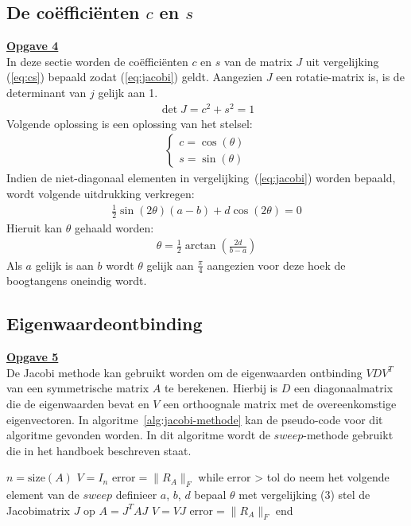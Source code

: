 \documentclass[a4paper, 12pt, titlepage, fleqn]{article}
\begin{document}
\subsection{De co\"effici\"enten $c$ en $s$}
\underline{\textbf{Opgave 4}}\\

In deze sectie worden de co\"effici\"enten $c$ en $s$ van de matrix $J$ uit vergelijking (\ref{eq:cs}) bepaald zodat (\ref{eq:jacobi}) geldt. Aangezien $J$ een rotatie-matrix is, is de determinant van $j$ gelijk aan 1.
\begin{align*}
\det J = c^2 + s^2 = 1
\end{align*}
Volgende oplossing is een oplossing van het stelsel:
\begin{align*}
\begin{cases}
c = \cos(\theta)\\
s = \sin(\theta)
\end{cases}
\end{align*}
Indien de niet-diagonaal elementen in vergelijking~(\ref{eq:jacobi}) worden bepaald, wordt volgende uitdrukking verkregen:
\begin{align*}
\frac{1}{2}\sin(2\theta)(a-b) + d\cos(2\theta) = 0
\end{align*}
Hieruit kan $\theta$ gehaald worden:
\begin{align}\label{eq:theta}
\theta = \frac{1}{2}\arctan\left(\frac{2d}{b-a}\right)
\end{align}
Als $a$ gelijk is aan $b$ wordt $\theta$ gelijk aan $\frac{\pi}{4}$ aangezien voor deze hoek de boogtangens oneindig wordt.

\subsection{Eigenwaardeontbinding}
\underline{\textbf{Opgave 5}}\\

De Jacobi methode kan gebruikt worden om de eigenwaarden ontbinding $VDV^T$ van een symmetrische matrix $A$ te berekenen. Hierbij is $D$ een diagonaalmatrix die de eigenwaarden bevat en $V$ een orthoognale matrix met de overeenkomstige eigenvectoren. In algoritme~\ref{alg:jacobi-methode} kan de pseudo-code voor dit algoritme gevonden worden. In dit algoritme wordt de $sweep$-methode gebruikt die in het handboek beschreven staat.

\begin{algorithm}[caption={Jacobi-methode}, label={alg:jacobi-methode}]
$n = \text{size}(A)$
$V = I_n$
$\text{error} = \|R_A\|_F$
while error > tol do
	neem het volgende element van de $sweep$
	definieer $a$, $b$, $d$
	bepaal $\theta$ met vergelijking (3)
	stel de Jacobimatrix $J$ op
	$A = J^TAJ$
	$V = VJ$
	$\text{error} = \|R_A\|_F$
end
\end{algorithm}
\end{document}
